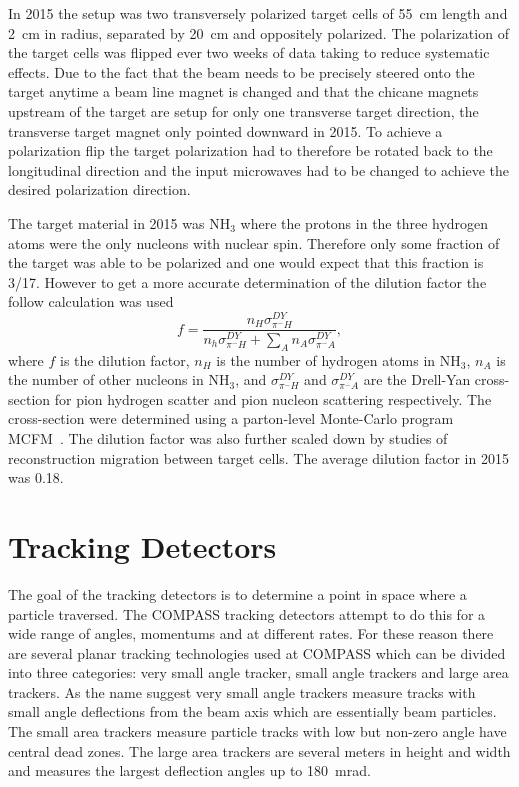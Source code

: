 In 2015 the setup was two transversely polarized target cells of 55~cm length
and 2~cm in radius, separated by 20~cm and oppositely polarized.  The
polarization of the target cells was flipped ever two weeks of data taking to
reduce systematic effects.  Due to the fact that the beam needs to be precisely
steered onto the target anytime a beam line magnet is changed and that the
chicane magnets upstream of the target are setup for only one transverse target
direction, the transverse target magnet only pointed downward in 2015.  To
achieve a polarization flip the target polarization had to therefore be rotated
back to the longitudinal direction and the input microwaves had to be changed to
achieve the desired polarization direction. \par

The target material in 2015 was NH$_3$ where the protons in the three hydrogen
atoms were the only nucleons with nuclear spin.  Therefore only some fraction of
the target was able to be polarized and one would expect that this fraction is
3/17.  However to get a more accurate determination of the dilution factor the
follow calculation was used
\begin{equation}
  f = \frac{n_H\sigma^{DY}_{\pi^-H}}
  {n_h\sigma^{DY}_{\pi^-H} + \sum_A n_A\sigma^{DY}_{\pi^-A}},
\end{equation}
where $f$ is the dilution factor, $n_H$ is the number of hydrogen atoms in
NH$_3$, $n_A$ is the number of other nucleons in NH$_3$, and
$\sigma^{DY}_{\pi^-H}$ and $\sigma^{DY}_{\pi^-A}$ are the Drell-Yan
cross-section for pion hydrogen scatter and pion nucleon scattering
respectively.  The cross-section were determined using a parton-level
Monte-Carlo program MCFM~\cite{MCFM}.  The dilution factor was also further
scaled down by studies of reconstruction migration between target cells.  The
average dilution factor in 2015 was 0.18.


\section{Tracking Detectors} \label{sec::tracking}
The goal of the tracking detectors is to determine a point in space where a
particle traversed.  The COMPASS tracking detectors attempt to do this for a
wide range of angles, momentums and at different rates.  For these reason there
are several planar tracking technologies used at COMPASS which can be divided
into three categories: very small angle tracker, small angle trackers and large
area trackers.  As the name suggest very small angle trackers measure tracks
with small angle deflections from the beam axis which are essentially beam
particles.  The small area trackers measure particle tracks with low but
non-zero angle have central dead zones.  The large area trackers are several
meters in height and width and measures the largest deflection angles up to
180~mrad. \par


